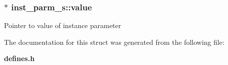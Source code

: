 \subsubsection{$\ast$ inst\_\-parm\_\-s::value}\label{structinst__parm__s_m1}


Pointer to value of instance parameter 

The documentation for this struct was generated from the following file:\begin{CompactItemize}
\item 
{\bf defines.h}\end{CompactItemize}
